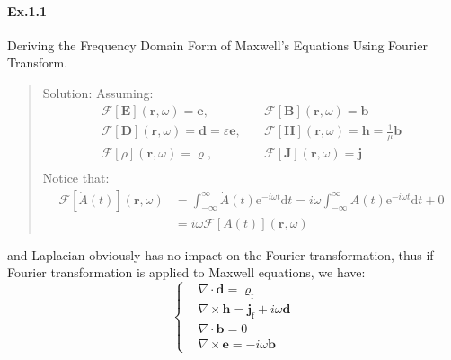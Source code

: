 \documentclass[11pt,a4paper,oneside]{book}
\begin{document}
\paragraph{Ex.1.1} Deriving the Frequency Domain Form of Maxwell's Equations Using Fourier Transform.
\begin{quotation}
  Solution: Assuming:
  \begin{equation}
  	\begin{aligned}
  		&\mathcal{F}[\mathbf{E}](\mathbf{r},\omega)=\mathbf{e},\quad &\mathcal{F}[\mathbf{B}](\mathbf{r},\omega)=\mathbf{b}&\\
  		&\mathcal{F}[\mathbf{D}](\mathbf{r},\omega)=\mathbf{d}=\varepsilon \mathbf{e},\quad &\mathcal{F}[\mathbf{H}](\mathbf{r},\omega)=\mathbf{h}=\frac{1}{\mu}\mathbf{b}&\\
  		&\mathcal{F}[\rho](\mathbf{r},\omega)=\varrho,\quad &\mathcal{F}[\mathbf{J}](\mathbf{r},\omega)=\mathbf{j}&\\
  	\end{aligned}
  \end{equation}
  Notice that:\begin{equation}
  	\begin{aligned}
  		\mathcal{F}[\dot A(t)](\mathbf{r},\omega)&=\int_{-\infty}^{\infty}\dot A(t)\text{e}^{-i\omega t}\text{d}t=i\omega\int_{-\infty}^{\infty}A(t)\text{e}^{-i\omega t}\text{d}t+0
  		\\&=i\omega\mathcal{F}[A(t)](\mathbf{r},\omega)
  	\end{aligned}
  \end{equation}
\end{quotation}
and Laplacian obviously has no impact on the Fourier transformation, thus if Fourier transformation is applied to Maxwell equations, we have:
\begin{equation}\left\{
	\begin{aligned}
		&{\displaystyle \nabla \cdot \mathbf {d} =\varrho _{\text{f}}}\\
		&{\displaystyle \nabla \times \mathbf {h} =\mathbf {j} _{\text{f}}+i\omega \mathbf{d}}\\
		&{\displaystyle \nabla \cdot \mathbf {b} =0}\\
		&{\displaystyle \nabla \times \mathbf {e} =-i\omega \mathbf{b}}
	\end{aligned}\right.
\end{equation}

\newpage
\end{document}
